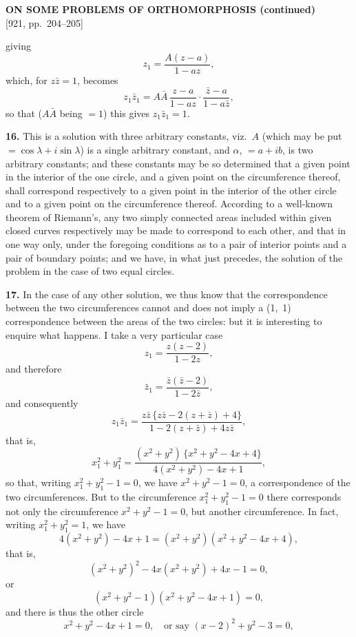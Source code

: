 \documentclass[11pt,a4paper]{article}
\begin{document}
\setcounter{page}{204}

\begin{center}
{\large\bfseries ON SOME PROBLEMS OF ORTHOMORPHOSIS (continued)}\\[0.4em]
{\small [921, pp.\ 204--205]}
\end{center}
\vspace{0.4em}

giving
\[
z_1 = \frac{A(z - a)}{1 - az},
\]
which, for $z\bar{z} = 1$, becomes
\[
z_1 \bar{z}_1 = A \bar{A}\,\frac{z-a}{1-az}\!\cdot\!\frac{\bar{z}-a}{1-a\bar{z}},
\]
so that ($A\bar{A}$ being $=1$) this gives $z_1\bar{z}_1 = 1$.

\textbf{16.} This is a solution with three arbitrary constants, viz.\ $A$ (which may be put $=\cos\lambda+i\sin\lambda$) is a single arbitrary constant, and $\alpha$, $=a+ib$, is two arbitrary constants; and these constants may be so determined that a given point in the interior of the one circle, and a given point on the circumference thereof, shall correspond respectively to a given point in the interior of the other circle and to a given point on the circumference thereof. According to a well-known theorem of Riemann's, any two simply connected areas included within given closed curves respectively may be made to correspond to each other, and that in one way only, under the foregoing conditions as to a pair of interior points and a pair of boundary points; and we have, in what just precedes, the solution of the problem in the case of two equal circles.

\textbf{17.} In the case of any other solution, we thus know that the correspondence between the two circumferences cannot and does not imply a (1,~1) correspondence between the areas of the two circles: but it is interesting to enquire what happens. I take a very particular case
\[
z_1 = \frac{z(z-2)}{1-2z},
\]
and therefore
\[
\bar{z}_1 = \frac{\bar{z}(\bar{z}-2)}{1-2\bar{z}},
\]
and consequently
\[
z_1\bar{z}_1 = \frac{z\bar{z}\,\{z\bar{z} - 2(z+\bar{z}) + 4\}}{1 - 2(z+\bar{z}) + 4z\bar{z}},
\]
that is,
\[
x_1^2 + y_1^2 = \frac{(x^2 + y^2)\,\{x^2 + y^2 - 4x + 4\}}{4(x^2 + y^2) - 4x + 1},
\]
so that, writing $x_1^2 + y_1^2 - 1 = 0$, we have $x^2 + y^2 - 1 = 0$, a correspondence of the two circumferences. But to the circumference $x_1^2 + y_1^2 - 1 = 0$ there corresponds not only the circumference $x^2 + y^2 - 1 = 0$, but another circumference. In fact, writing $x_1^2 + y_1^2 = 1$, we have
\[
4(x^2 + y^2) - 4x + 1 = (x^2 + y^2)(x^2 + y^2 - 4x + 4),
\]
that is,
\[
(x^2 + y^2)^2 - 4x(x^2 + y^2) + 4x - 1 = 0,
\]
or
\[
(x^2 + y^2 - 1)(x^2 + y^2 - 4x + 1) = 0,
\]
and there is thus the other circle
\[
x^2 + y^2 - 4x + 1 = 0, \quad \text{or say } (x-2)^2 + y^2 - 3 = 0,
\]
\end{document}
